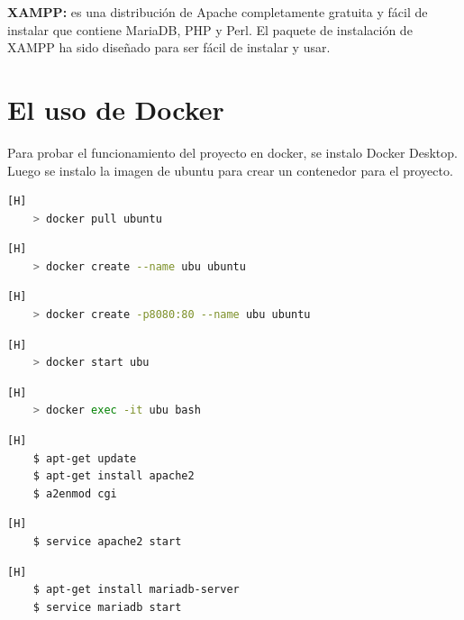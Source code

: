 \textbf{XAMPP: } es una distribución de Apache completamente gratuita y fácil de instalar que contiene MariaDB, PHP y Perl. El paquete de instalación de XAMPP ha sido diseñado para ser fácil de instalar y usar.

\section{El uso de Docker}

Para probar el funcionamiento del proyecto en docker, se instalo Docker Desktop. Luego se instalo la imagen de ubuntu para crear un contenedor para el proyecto. 

\begin{lstlisting}[language=bash,caption={Descargando la imagen de ubuntu}][H]
    > docker pull ubuntu
\end{lstlisting}

\begin{lstlisting}[language=bash,caption={Creando el contendor ubu}][H]
    > docker create --name ubu ubuntu
\end{lstlisting}

\begin{lstlisting}[language=bash,caption={Creando el contendor ubu}][H]
    > docker create -p8080:80 --name ubu ubuntu
\end{lstlisting}

\begin{lstlisting}[language=bash,caption={Inciando el servidor}][H]
    > docker start ubu
\end{lstlisting}

\begin{lstlisting}[language=bash,caption={Ingresamos al contenedor}][H]
    > docker exec -it ubu bash
\end{lstlisting}

\begin{lstlisting}[language=bash,caption={Instalando apache2 dentro del contenedor}][H]
    $ apt-get update
    $ apt-get install apache2
    $ a2enmod cgi
\end{lstlisting}

\begin{lstlisting}[language=bash,caption={Prendemos apache}][H]
    $ service apache2 start
\end{lstlisting}

\begin{lstlisting}[language=bash,caption={Se instala MariaDB y seguidamente lo activamos}][H]
    $ apt-get install mariadb-server
    $ service mariadb start
\end{lstlisting}

